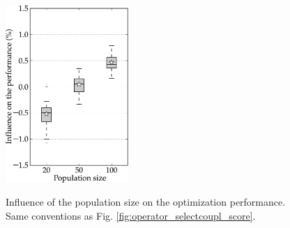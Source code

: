 \documentclass{ametsoc}
\begin{document}
\begin{figure}[t]
	\begin{center}
		\noindent\includegraphics[width=11pc,angle=0]{fig12.pdf}\\
	\end{center}
	\caption{Influence of the population size on the optimization performance. Same conventions as Fig. \ref{fig:operator_selectcoupl_score}.}
	\label{fig:option_taillepop_score}
\end{figure}
\end{document}
